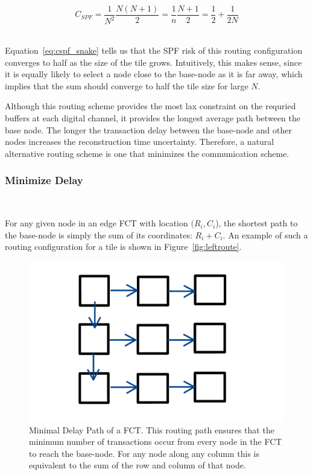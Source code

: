 \begin{equation}
  C_{SPF} = \frac{1}{N^{2}}\frac{N(N+1)}{2} = \frac{1}{n}\frac{N+1}{2} = \frac{1}{2} + \frac{1}{2N}
\end{equation}~\label{eq:cspf_snake}

Equation~\ref{eq:cspf_snake} tells us that the SPF risk of this routing configuration converges to half as the size of the tile grows.
Intuitively, this makes sense, since it is equally likely to select a node close to the base-node as it is far away, which implies that the sum should converge to half the tile size for large $N$.

Although this routing scheme provides the most lax constraint on the requried buffers at each digital channel, it provides the longest average path between the base node.
The longer the transaction delay between the base-node and other nodes increases the reconstruction time uncertainty.
Therefore, a natural alternative routing scheme is one that minimizes the communication scheme.

\subsubsection{Minimize Delay}~\label{sec:min_comm}

For any given node in an edge FCT with location $(R_{i},C_{i}$), the shortest path to the base-node is simply the sum of its coordinates: $R_{i}+C_{i}$.
An example of such a routing configuration for a tile is shown in Figure~\ref{fig:leftroute}.

\begin{figure}[]
\centering
\includegraphics[width=\textwidth]{images/leftroute.pdf}
\caption{Minimal Delay Path of a FCT. This routing path ensures that the minimum number of transactions occur from every node in the FCT to reach the base-node. For any node along any column this is equivalent to the sum of the row and column of that node.}
\end{figure}~\label{fig:leftroute}

